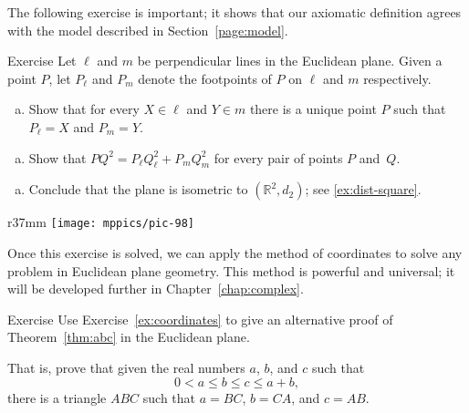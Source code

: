 The following exercise is important;
it shows that our axiomatic definition agrees with the model described in Section~\ref{page:model}.


\begin{thm}{Exercise}\label{ex:coordinates} 
Let $\ell$ and $m$ be perpendicular lines in the Euclidean plane.
Given a point $P$, let $P_\ell$ and $P_m$ denote the footpoints of $P$ on $\ell$ and $m$ respectively.

\begin{enumerate}[(a)]
\item Show that for every $X\in \ell$ and $Y\in m$ there is a unique point $P$ such that $P_\ell=X$ and $P_m=Y$.
\end{enumerate}

\begin{enumerate}[(a)]\addtocounter{enumi}{1}
\item
Show that 
$PQ^2=P_\ell Q_\ell^2+P_mQ_m^2$
for every pair of points $P$ and~$Q$.
\end{enumerate}

\begin{enumerate}[(a)]\addtocounter{enumi}{2}
\item Conclude that the plane is isometric to $(\mathbb{R}^2,d_2)$; see \ref{ex:dist-square}.
\end{enumerate}

\end{thm}

\begin{wrapfigure}{r}{37mm}
\centering
\texttt{[image: mppics/pic-98]}
\end{wrapfigure}

Once this exercise is solved, we can apply 
the method of coordinates
to solve any problem in Euclidean plane geometry.
This method is powerful and universal;
it will be developed further in Chapter~\ref{chap:complex}.

\begin{thm}{Exercise}\label{ex:abc}
Use Exercise~\ref{ex:coordinates}
to give an alternative proof of Theorem~\ref{thm:abc} in the Euclidean plane.

That is, prove that given the real numbers $a$, $b$, and $c$ such that 
 $$0<a\le b\le c\le a+b,$$
there is a triangle $ABC$
such that $a=BC$, $b=CA$, and $c=AB$.
\end{thm} 

